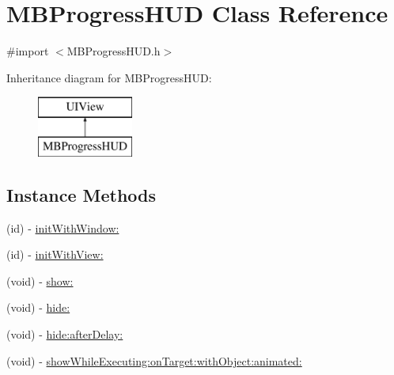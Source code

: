 \hypertarget{interface_m_b_progress_h_u_d}{\section{M\+B\+Progress\+H\+U\+D Class Reference}
\label{interface_m_b_progress_h_u_d}
}


{\ttfamily \#import $<$M\+B\+Progress\+H\+U\+D.\+h$>$}

Inheritance diagram for M\+B\+Progress\+H\+U\+D\+:\begin{figure}[H]
\begin{center}
\leavevmode
\includegraphics[height=2.000000cm]{interface_m_b_progress_h_u_d}
\end{center}
\end{figure}
\subsection*{Instance Methods}
\begin{DoxyCompactItemize}
\item 
(id) -\/ \hyperlink{interface_m_b_progress_h_u_d_a8f3c01167d59153c85ae7efdca7717fc}{init\+With\+Window\+:}
\item 
(id) -\/ \hyperlink{interface_m_b_progress_h_u_d_ae42ee0d2d0ea58fac1ce8de6b5ea3b60}{init\+With\+View\+:}
\item 
(void) -\/ \hyperlink{interface_m_b_progress_h_u_d_a3ef075a3be624c2f94629d63bfeae25b}{show\+:}
\item 
(void) -\/ \hyperlink{interface_m_b_progress_h_u_d_a500fd79859e56cf98fd2eebfd37b4204}{hide\+:}
\item 
(void) -\/ \hyperlink{interface_m_b_progress_h_u_d_aec6533c21bf8a9f3e552cb133ef6aeed}{hide\+:after\+Delay\+:}
\item 
(void) -\/ \hyperlink{interface_m_b_progress_h_u_d_a23cd23b9c46bd819f14314426ed9dcdb}{show\+While\+Executing\+:on\+Target\+:with\+Object\+:animated\+:}
\end{DoxyCompactItemize}
